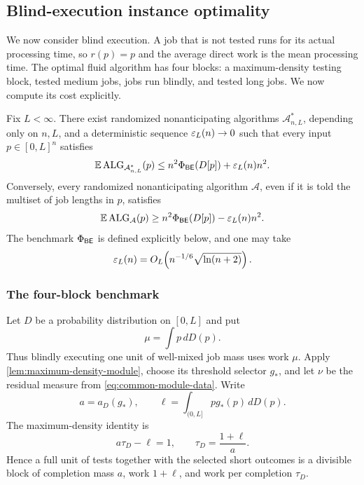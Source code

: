 \subsection{Blind-execution instance optimality}
\label{sec:blind}

We now consider blind execution.  A job that is not tested runs for its
actual processing time, so $r(p)=p$ and the average direct work is the mean
processing time.  The optimal fluid algorithm has four blocks: a
maximum-density testing block, tested medium jobs, jobs run blindly, and
tested long jobs.  We now compute its cost explicitly.

\begin{theorem}
\label{thm:blind-instance}
Fix $L<\infty$.  There exist randomized nonanticipating algorithms
$\mathcal A^*_{n,L}$, depending only on $n,L$, and a deterministic sequence
$\varepsilon_L(n)\to0$ such that every input $p\in[0,L]^n$ satisfies
\begin{equation}
 \mathbb{E}\operatorname{ALG}_{\mathcal A^*_{n,L}}(p)
 \le n^2\Phi_{\mathsf{BE}}(D[p])+\varepsilon_L(n)n^2.
 \label{eq:intro-blind-upper}
\end{equation}
Conversely, every randomized nonanticipating algorithm $\mathcal A$, even if
it is told the multiset of job lengths in $p$, satisfies
\begin{equation}
 \mathbb{E}\operatorname{ALG}_{\mathcal A}(p)
 \ge n^2\Phi_{\mathsf{BE}}(D[p])-\varepsilon_L(n)n^2.
 \label{eq:intro-blind-lower}
\end{equation}
The benchmark $\Phi_{\mathsf{BE}}$ is defined explicitly below, and one may take
\[
 \varepsilon_L(n)=O_L\!\left(n^{-1/6}\sqrt{\ln(n+2)}\right).
\]
\end{theorem}

\subsubsection{The four-block benchmark}
\label{sec:blind-benchmark}

Let $D$ be a probability distribution on $[0,L]$ and put
\begin{equation}
 \mu=\int p\,dD(p).
 \label{eq:blind-mean}
\end{equation}
Thus blindly executing one unit of well-mixed job mass uses work $\mu$.
Apply \cref{lem:maximum-density-module}, choose its threshold selector $g_*$,
and let $\nu$ be the residual measure from
\cref{eq:common-module-data}.  Write
\[
 a=a_D(g_*),\qquad
 \ell=\int_{(0,L]}p g_*(p)\,dD(p).
\]
The maximum-density identity is
\begin{equation}
 a\tau_D-\ell=1,
 \qquad \tau_D=\frac{1+\ell}{a}.
 \label{eq:blind-test-module}
\end{equation}
Hence a full unit of tests together with the selected short outcomes is a
divisible block of completion mass $a$, work $1+\ell$, and work per
completion $\tau_D$.

